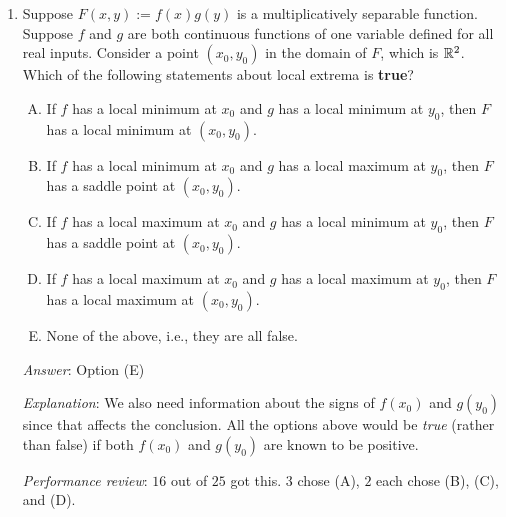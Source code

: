 \documentclass[10pt]{amsart}
\begin{document}
\begin{enumerate}
  \begin{enumerate}[(A)]
  \item If $f$ has a local minimum at $x_0$ and $g$ has a local
    minimum at $y_0$, then $F$ has a local minimum at $(x_0,y_0)$.
  \item If $f$ has a local minimum at $x_0$ and $g$ has a local
    maximum at $y_0$, then $F$ has a saddle point at $(x_0,y_0)$.
  \item If $f$ has a local maximum at $x_0$ and $g$ has a local
    minimum at $y_0$, then $F$ has a saddle point at $(x_0,y_0)$.
  \item If $f$ has a local maximum at $x_0$ and $g$ has a local
    maximum at $y_0$, then $F$ has a local maximum at $(x_0,y_0)$.
  \item None of the above, i.e., they are all true.
  \end{enumerate}
  
  {\em Answer}: Option (E)

  {\em Explanation}: This is discussed in the lecture notes.

  {\em Performance review}: $21$ out of $25$ got this. $2$ chose
  (B). $1$ each chose (A) and (D).

\item Suppose $F(x,y) := f(x)g(y)$ is a multiplicatively separable
  function. Suppose $f$ and $g$ are both continuous functions of
  one variable defined for all real inputs. Consider a point
  $(x_0,y_0)$ in the domain of $F$, which is $\mathbb{R}^2$. Which of the
  following statements about local extrema is {\bf true}?

  \begin{enumerate}[(A)]
  \item If $f$ has a local minimum at $x_0$ and $g$ has a local
    minimum at $y_0$, then $F$ has a local minimum at $(x_0,y_0)$.
  \item If $f$ has a local minimum at $x_0$ and $g$ has a local
    maximum at $y_0$, then $F$ has a saddle point at $(x_0,y_0)$.
  \item If $f$ has a local maximum at $x_0$ and $g$ has a local
    minimum at $y_0$, then $F$ has a saddle point at $(x_0,y_0)$.
  \item If $f$ has a local maximum at $x_0$ and $g$ has a local
    maximum at $y_0$, then $F$ has a local maximum at $(x_0,y_0)$.
  \item None of the above, i.e., they are all false.
  \end{enumerate}

  {\em Answer}: Option (E)

  {\em Explanation}: We also need information about the signs of
  $f(x_0)$ and $g(y_0)$ since that affects the conclusion. All the
  options above would be {\em true} (rather than false) if both
  $f(x_0)$ and $g(y_0)$ are known to be positive.

  {\em Performance review}: $16$ out of $25$ got this. $3$ chose (A),
  $2$ each chose (B), (C), and (D).
\end{enumerate}
\end{document}
